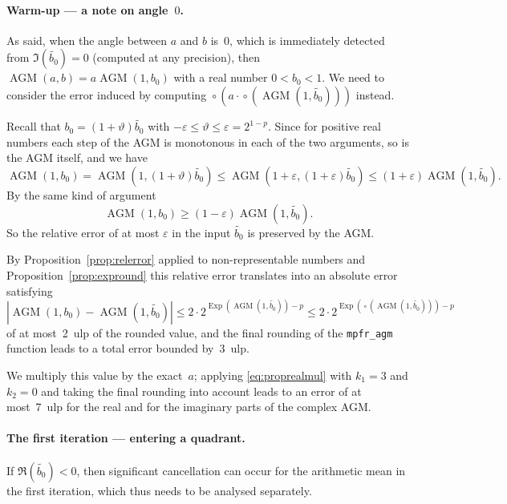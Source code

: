 \documentclass [11pt]{article}
\newcommand {\appro}[1]{\widetilde {#1}}
\newcommand {\ulp}[1]{#1~ulp}
\DeclareMathOperator{\Exp}{\operatorname {Exp}}
\newcommand {\round}{\operatorname {\circ}}
\renewcommand {\epsilon}{\varepsilon}
\renewcommand {\theta}{\vartheta}
\renewcommand {\leq}{\leqslant}
\renewcommand {\geq}{\geqslant}
\newcommand {\AGM}{\operatorname{AGM}}
\begin{document}
\paragraph {Warm-up --- a note on angle~$0$.}

As said, when the angle between $a$ and $b$ is~$0$, which is immediately
detected from $\Im (\appro {b_0}) = 0$ (computed at any precision),
then $\AGM (a, b) = a \AGM (1, b_0)$ with a real number $0 < b_0 < 1$.
We need to consider the error induced by computing
$\round \left( a \cdot \round \left( \AGM (1, \appro {b_0}) \right) \right)$
instead.

Recall that $b_0 = (1 + \theta) \appro {b_0}$ with
$- \epsilon \leq \theta \leq \epsilon = 2^{1-p}$.
Since for positive real numbers each step of the AGM is monotonous in
each of the two arguments, so is the AGM itself, and we have
\[
\AGM (1, b_0)
= \AGM \left( 1, (1 + \theta) \appro {b_0} \right)
\leq \AGM \left( 1 + \epsilon, (1 + \epsilon) \appro {b_0} \right)
\leq (1 + \epsilon) \AGM \left( 1, \appro {b_0} \right).
\]
By the same kind of argument
\[
\AGM (1, b_0) \geq (1 - \epsilon) \AGM \left( 1, \appro {b_0} \right).
\]
So the relative error of at most $\epsilon$ in the input $\appro {b_0}$
is preserved by the AGM.

By Proposition~\ref {prop:relerror} applied to non-representable numbers
and Proposition~\ref {prop:expround} this relative error translates into
an absolute error satisfying
\[
\left| \AGM (1, b_0) - \AGM \left( 1, \appro {b_0} \right) \right|
\leq 2 \cdot 2^{\Exp \left( \AGM \left( 1, \appro {b_0} \right) \right)
   - p}
\leq 2 \cdot 2^{\Exp \left( \round \left(
   \AGM \left( 1, \appro {b_0} \right) \right) \right) - p}
\]
of at most~\ulp {2} of the rounded value, and the final rounding of the
\texttt {mpfr\_agm} function leads to a total error bounded by~\ulp {3}.

We multiply this value by the exact~$a$; applying \eqref {eq:proprealmul}
with $k_1 = 3$ and $k_2 = 0$ and taking the final rounding into account
leads to an error of at most~\ulp {7} for the real and for the imaginary
parts of the complex AGM.


\paragraph {The first iteration --- entering a quadrant.}
If $\Re (\appro {b_0}) < 0$, then significant cancellation can occur for the
arithmetic mean in the first iteration, which thus needs to be analysed
separately.
\end{document}
